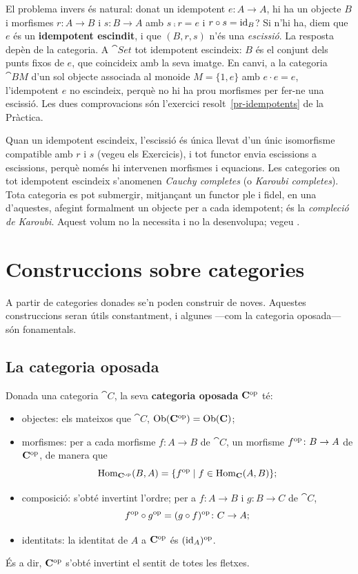 El problema invers és natural: donat un idempotent $e\colon A\to A$, hi ha un objecte $B$ i morfismes $r\colon A\to B$ i $s\colon B\to A$ amb $s\comp r=e$ i $r\circ s=\operatorname{id}_B$? Si n'hi ha, diem que $e$ és un \textbf{idempotent escindit}, i que $(B,r,s)$ n'és una \emph{escissió}. La resposta depèn de la categoria. A $\cat{Set}$ tot idempotent escindeix: $B$ és el conjunt dels punts fixos de $e$, que coincideix amb la seva imatge. En canvi, a la categoria $\cat{B}M$ d'un sol objecte associada al monoide $M=\{1,e\}$ amb $e\cdot e=e$, l'idempotent $e$ no escindeix, perquè no hi ha prou morfismes per fer-ne una escissió. Les dues comprovacions són l'exercici resolt~\ref{pr-idempotents} de la Pràctica.

\begin{observacio}
Quan un idempotent escindeix, l'escissió és única llevat d'un únic isomorfisme compatible amb $r$ i $s$ (vegeu els Exercicis), i tot functor envia escissions a escissions, perquè només hi intervenen morfismes i equacions. Les categories on tot idempotent escindeix s'anomenen \emph{Cauchy completes} (o \emph{Karoubi completes}). Tota categoria es pot submergir, mitjançant un functor ple i fidel, en una d'aquestes, afegint formalment un objecte per a cada idempotent; és la \emph{compleció de Karoubi}. Aquest volum no la necessita i no la desenvolupa; vegeu \cite{borceux}.
\end{observacio}

\section{Construccions sobre categories}

A partir de categories donades se'n poden construir de noves. Aquestes construccions seran útils constantment, i algunes ---com la categoria oposada--- són fonamentals.

\subsection{La categoria oposada}

\begin{definicio}
Donada una categoria $\cat{C}$, la seva \textbf{categoria oposada} $\mathbf{C}^{\mathrm{op}}$ té:
\begin{itemize}
\item objectes: els mateixos que $\cat{C}$, $\operatorname{Ob}(\mathbf{C}^{\mathrm{op}})=\operatorname{Ob}(\mathbf{C})$;
\item morfismes: per a cada morfisme $f\colon A\to B$ de $\cat{C}$, un morfisme $f^{\mathrm{op}}\colon B\to A$ de $\mathbf{C}^{\mathrm{op}}$, de manera que
\[
\operatorname{Hom}_{\mathbf{C}^{\mathrm{op}}}(B,A)=\{f^{\mathrm{op}}\mid f\in\operatorname{Hom}_{\mathbf{C}}(A,B)\};
\]
\item composició: s'obté invertint l'ordre; per a $f\colon A\to B$ i $g\colon B\to C$ de $\cat{C}$,
\[
f^{\mathrm{op}}\circ g^{\mathrm{op}}=(g\circ f)^{\mathrm{op}}\colon C\to A;
\]
\item identitats: la identitat de $A$ a $\mathbf{C}^{\mathrm{op}}$ és $(\operatorname{id}_A)^{\mathrm{op}}$.
\end{itemize}
És a dir, $\mathbf{C}^{\mathrm{op}}$ s'obté invertint el sentit de totes les fletxes.
\end{definicio}

